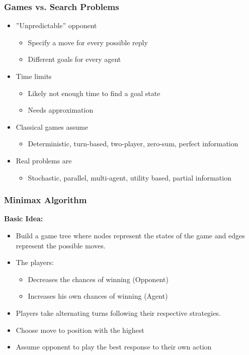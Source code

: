 \documentclass[
../EiKI_Summary.tex,
]
{subfiles}
\begin{document}
\subsubsection{Games vs. Search Problems}
\begin{itemize}
    \item ''Unpredictable'' opponent
    \begin{itemize}
        \item Specify a move for every possible reply
        \item Different goals for every agent
    \end{itemize}
    \item Time limits
    \begin{itemize}
        \item Likely not enough time to find a goal state
        \item Needs approximation
    \end{itemize}
    \item Classical games assume
    \begin{itemize}
        \item Deterministic, turn-based, two-player, zero-sum, perfect information
    \end{itemize}
    \item Real problems are
    \begin{itemize}
        \item Stochastic, parallel, multi-agent, utility based, partial information
    \end{itemize}
\end{itemize}

\subsubsection{Minimax Algorithm}
\textbf{Basic Idea:}
\begin{itemize}
    \item Build a game tree where nodes represent the states of the game and edges represent the possible moves.
    \item The players:
    \begin{itemize}
        \item {} Decreases the chances of  winning (Opponent)
        \item {} Increases his own chances of winning (Agent)
    \end{itemize}
    \item Players take alternating turns following their respective strategies.
    \item Choose move to position with the highest 
    \item Assume opponent to play the best response to their own action 
\end{itemize}
\end{document}
